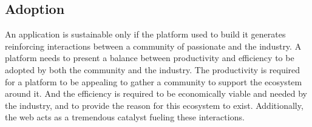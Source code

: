 








\subsection{Adoption} \label{chapter3:definitions:adoption}

An application is sustainable only if the platform used to build it generates reinforcing interactions between a community of passionate and the industry.
A platform needs to present a balance between productivity and efficiency to be adopted by both the community and the industry.
The productivity is required for a platform to be appealing to gather a community to support the ecosystem around it.
And the efficiency is required to be economically viable and needed by the industry, and to provide the reason for this ecosystem to exist.
Additionally, the web acts as a tremendous catalyst fueling these interactions.

\paragraph{}

